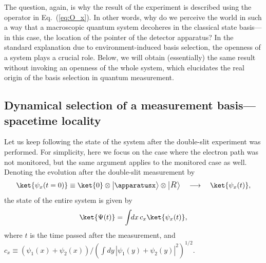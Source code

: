 \documentclass[12pt]{article}
\begin{document}
The question, again, is why the result of the experiment is described 
using the operator in Eq.~(\ref{eq:O_x}).  In other words, why do we 
perceive the world in such a way that a macroscopic quantum system 
decoheres in the classical state basis---in this case, the location 
of the pointer of the detector apparatus?  In the standard explanation 
due to environment-induced basis selection, the openness of a system 
plays a crucial role.  Below, we will obtain (essentially) the same 
result without invoking an openness of the whole system, which elucidates 
the real origin of the basis selection in quantum measurement.


\subsection{Dynamical selection of a measurement basis---spacetime locality}
\label{subsec:collapse}

Let us keep following the state of the system after the double-slit 
experiment was performed.  For simplicity, here we focus on the case 
where the electron path was not monitored, but the same argument 
applies to the monitored case as well.  Denoting the evolution after 
the double-slit measurement by
%
\begin{equation}
  \ket{\psi_x(t=0)} \equiv \ket{0} \otimes \bigl|\apparatusx\bigr> 
    \otimes \bigl|\mbox{\large $R_{}$}\bigr>
\quad
  \longrightarrow
\quad
  \ket{\psi_x(t)},
\label{eq:evol-after}
\end{equation}
%
the state of the entire system is given by
%
\begin{equation}
  \ket{\Psi(t)} = \int\!\!dx\, c_x \ket{\psi_x(t)},
\label{eq:Psi-after}
\end{equation}
%
where $t$ is the time passed after the measurement, and $c_x \equiv 
(\psi_1(x) + \psi_2(x))/(\int\!dy\,|\psi_1(y) + \psi_2(y)|^2)^{1/2}$.
\end{document}
